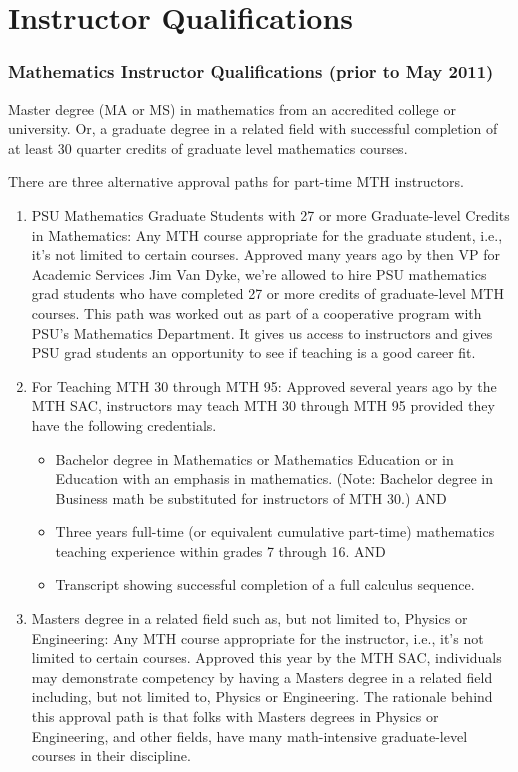 \chapter{Instructor Qualifications}\label{app:sec:instructorquals}
\subsection{Mathematics Instructor Qualifications (prior to May 2011)}
Master degree (MA or MS) in mathematics from an accredited college or university.  Or, a graduate degree in a related field with successful completion of at least 30 quarter credits of graduate level mathematics courses.

There are three alternative approval paths for part-time MTH instructors.
\begin{enumerate}
  \item PSU Mathematics Graduate Students with 27 or more Graduate-level Credits in Mathematics: Any MTH course appropriate for the graduate student, i.e., it's not limited to certain courses. Approved many years ago by then VP for Academic Services Jim Van Dyke, we're allowed to hire PSU mathematics grad students who have completed 27 or more credits of graduate-level MTH courses. This path was worked out as part of a cooperative program with PSU's Mathematics Department. It gives us access to instructors and gives PSU grad students an opportunity to see if teaching is a good career fit.
  \item For Teaching MTH 30 through MTH 95: Approved several years ago by the MTH SAC, instructors may teach MTH 30 through MTH 95 provided they have the following credentials.
    \begin{itemize}
      \item Bachelor degree in Mathematics or Mathematics Education or in Education with an emphasis in mathematics. (Note: Bachelor degree in Business math be substituted for instructors of MTH 30.)
        AND
      \item Three years full-time (or equivalent cumulative part-time) mathematics teaching experience within grades 7 through 16.
        AND
      \item Transcript showing successful completion of a full calculus sequence.
    \end{itemize}
  \item Masters degree in a related field such as, but not limited to, Physics or Engineering: Any MTH course appropriate for the instructor, i.e., it's not limited to certain courses. Approved this year by the MTH SAC, individuals may demonstrate competency by having a Masters degree in a related field including, but not limited to, Physics or Engineering. The rationale behind this approval path is that folks with Masters degrees in Physics or Engineering, and other fields, have many math-intensive graduate-level courses in their discipline.
\end{enumerate}


